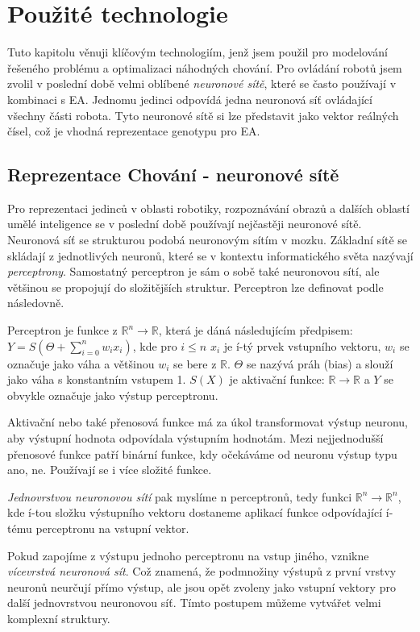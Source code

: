 \section{Použité technologie}
Tuto kapitolu věnuji klíčovým technologiím, jenž jsem použil pro modelování řešeného problému a optimalizaci náhodných chování. Pro ovládání robotů jsem zvolil v poslední době velmi oblíbené \textit{neuronové sítě}, které se často používají v kombinaci s EA. Jednomu jedinci odpovídá jedna neuronová síť ovládající všechny části robota. Tyto neuronové sítě si lze představit jako vektor reálných čísel, což je vhodná reprezentace genotypu pro EA. 
\subsection*{Reprezentace Chování - neuronové sítě}
Pro reprezentaci jedinců v oblasti robotiky, rozpoznávání obrazů a dalších oblastí umělé inteligence se v poslední době používají nejčastěji neuronové sítě. Neuronová síť se strukturou podobá neuronovým sítím v mozku. Základní sítě se skládají z jednotlivých neuronů, které se v kontextu informatického světa nazývají \textit{perceptrony}. Samostatný perceptron je sám o sobě také neuronovou sítí, ale většinou se propojují do složitějších struktur. Perceptron lze definovat podle \citep{neuron} následovně.
\begin{definice}[Perceptron] Perceptron je funkce z $\mathbb{R}^n \rightarrow \mathbb{R}$, která je dáná následujícím předpisem: 	$Y = S(\Theta + \sum_{i=0}^{n} w_i x_i)$, kde pro $i \leq n$ $x_{i}$ je í-tý prvek vstupního vektoru, $w_{i}$ se označuje jako váha a většinou $w_{i} $ se bere z $\mathbb{R}$.  $\Theta$ se nazývá práh (bias) a slouží jako váha s konstantním vstupem 1.  $S(X)$ je aktivační funkce: $\mathbb{R} \rightarrow \mathbb{R}$ a $Y$ se obvykle označuje jako výstup perceptronu.
\end{definice}
Aktivační nebo také přenosová funkce má za úkol transformovat výstup neuronu, aby výstupní hodnota odpovídala výstupním hodnotám. Mezi nejjednodušší přenosové funkce patří binární funkce, kdy očekáváme od neuronu výstup typu ano, ne. Používají se i více složité funkce.
\par
\textit{Jednovrstvou neuronovou sítí} pak myslíme n perceptronů, tedy funkci $\mathbb{R}^{n} \rightarrow \mathbb{R}^{n}$, kde $í$-tou složku výstupního vektoru dostaneme aplikací funkce odpovídající $í$-tému perceptronu na vstupní vektor.
\par
Pokud zapojíme z výstupu jednoho perceptronu na vstup jiného, vznikne \textit{vícevrstvá neuronová sít}. Což znamená, že podmnožiny výstupů z první vrstvy neuronů neurčují přímo výstup, ale jsou opět zvoleny jako vstupní vektory pro další jednovrstvou neuronovou síť. Tímto postupem můžeme vytvářet velmi komplexní struktury.
